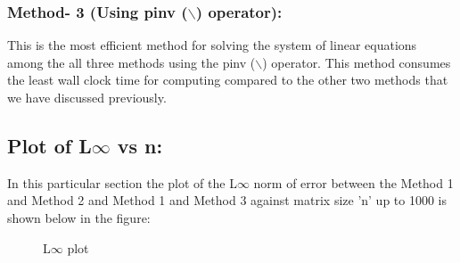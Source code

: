 \documentclass[12pt,a4paper]{article}
\begin{document}
\subsubsection{Method- 3 (Using pinv ($\backslash$) operator):}
This is the most efficient method for solving the system of linear equations among the all three methods using the pinv ($\backslash$)  operator. This method consumes the least wall clock time for computing compared to the other two methods that we have discussed previously.
\subsection{Plot of L$\infty$ vs n:}
In this particular section the plot of the L$\infty$ norm of error between the Method 1 and Method 2 and Method 1 and Method 3 against matrix size 'n' up to 1000 is shown below in the figure:
\begin{figure}[!ht]
	\begin{center}
	\end{center}
	\caption{L$\infty$ plot}
	\label{L∞ plot}
\end{figure}
\end{document}
